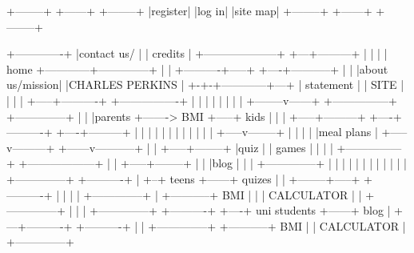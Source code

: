%
%
\begin{verbbox}

                                            +--------+ +------+   +--------+
                                            |register| |log in|   |site map|
                                            +--------+ +------+   +--------+



                                +-------------+
                                |contact us/  |
                                | credits     |
  +--------------------+        +---+---------+
  |                    |            |
  | home               +------------+--------------+
  |                    | +----------+-----+   +----+-----------+
  |                    | |about us/mission|   |CHARLES PERKINS |
  +-+-+------------+---+ | statement      |   | SITE           |
    | |            |     +-----+----------+   +----------------+
    | |            |
    | |            |
    | |   +--------v------+       +---------------+     +--------------+
    | |   |parents        +-------> BMI           +-----+ kids         |
    | |   +-----+---------+       +----+----------+     +----+---------+
    | |         |                      |                     |
    | |         |                      |                     |
    | |   +-----v--------+             |                     |
    | |   |meal plans    |       +-----v---------+    +------v-----------+
    | |   +-----+--------+       |quiz           |    | games            |
    | |         |                +---------------+    +------------------+
    | |   +-----+--------+
    | |   |blog          |
    | |   +--------------+
    | |
    | |
    | |
    | |
    | |
    | |  +--------------+      +----------+
    | +--+ teens        +------+ quizes   |
    |    +--------+-----+      +----------+
    |             |
    |             |           +--------------+
    |             +-----------+ BMI          |
    |                         | CALCULATOR   |
    |                         +--------------+
    |
    |
    |    +--------------+      +----------+
    +----+ uni students +------+ blog     |
         +---+----------+      +----------+
             |
             |           +--------------+
             +-----------+ BMI          |
                         | CALCULATOR   |
                         +--------------+

\end{verbbox}
\resizebox{0.95\textwidth}{!}{\theverbbox}

